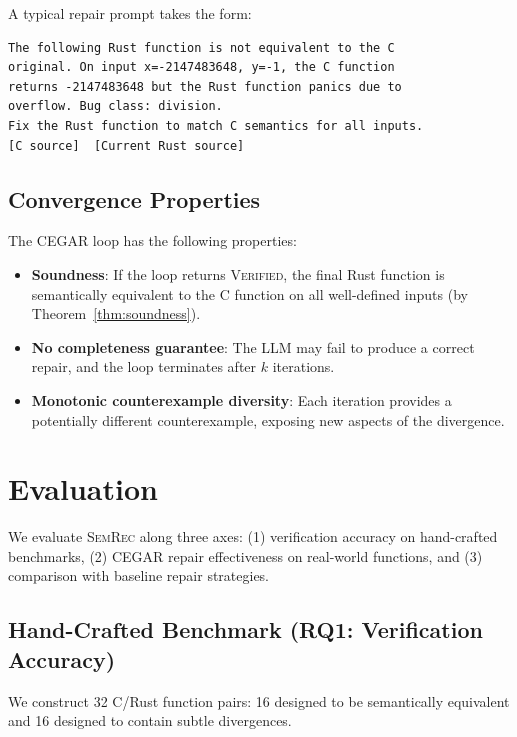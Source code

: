 \documentclass[10pt,letterpaper]{article}
\begin{document}
A typical repair prompt takes the form:

\begin{lstlisting}[language={},caption={Example repair prompt},label={lst:prompt}]
The following Rust function is not equivalent to the C
original. On input x=-2147483648, y=-1, the C function
returns -2147483648 but the Rust function panics due to
overflow. Bug class: division.
Fix the Rust function to match C semantics for all inputs.
[C source]  [Current Rust source]
\end{lstlisting}

\subsection{Convergence Properties}

The CEGAR loop has the following properties:
\begin{itemize}[itemsep=1pt]
\item \textbf{Soundness}: If the loop returns \textsc{Verified}, the final
  Rust function is semantically equivalent to the C function on all well-defined
  inputs (by Theorem~\ref{thm:soundness}).
\item \textbf{No completeness guarantee}: The LLM may fail to produce a correct
  repair, and the loop terminates after $k$ iterations.
\item \textbf{Monotonic counterexample diversity}: Each iteration provides a
  potentially different counterexample, exposing new aspects of the divergence.
\end{itemize}

\section{Evaluation}
\label{sec:evaluation}

We evaluate \textsc{SemRec} along three axes: (1) verification accuracy on
hand-crafted benchmarks, (2) CEGAR repair effectiveness on real-world functions,
and (3) comparison with baseline repair strategies.

\subsection{Hand-Crafted Benchmark (RQ1: Verification Accuracy)}

We construct 32 C/Rust function pairs: 16 designed to be semantically equivalent
and 16 designed to contain subtle divergences.
\end{document}
